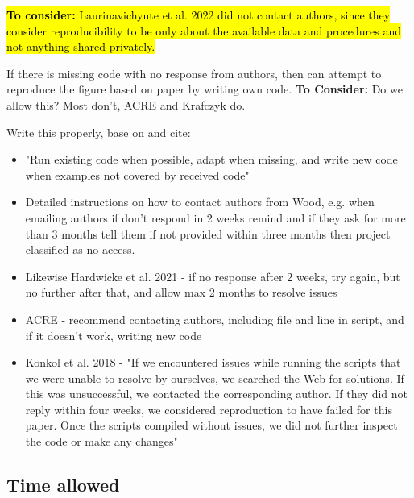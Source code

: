 \hl{\textbf{To consider:} Laurinavichyute et al. 2022 did not contact authors, since they consider reproducibility to be only about the available data and procedures and not anything shared privately.}\autocite{laurinavichyute_share_2022}

If there is missing code with no response from authors, then can attempt to reproduce the figure based on paper by writing own code. \textbf{To Consider:} Do we allow this? Most don't, ACRE and Krafczyk do.

Write this properly, base on and cite:
\begin{itemize}
    \item "Run existing code when possible, adapt when missing, and write new code when examples not covered by received code"\autocite{krafczyk_learning_2021}
    \item Detailed instructions on how to contact authors from Wood, e.g. when emailing authors if don't respond in 2 weeks remind and if they ask for more than 3 months tell them if not provided within three months then project classified as no access.\autocite{wood_push_2018,wood_replication_2018}
    \item Likewise Hardwicke et al. 2021 - if no response after 2 weeks, try again, but no further after that, and allow max 2 months to resolve issues
    \item ACRE - recommend contacting authors, including file and line in script, and if it doesn't work, writing new code\autocite{berkeley_initiative_for_transparency_in_the_social_sciences_guide_2022}
    \item Konkol et al. 2018 - "If we encountered issues while running the scripts that we were unable to resolve by ourselves, we searched the Web for solutions. If this was unsuccessful, we contacted the corresponding author. If they did not reply within four weeks, we considered reproduction to have failed for this paper. Once the scripts compiled without issues, we did not further inspect the code or make any changes" \autocite{konkol_computational_2019}
\end{itemize}

\subsection{Time allowed}


